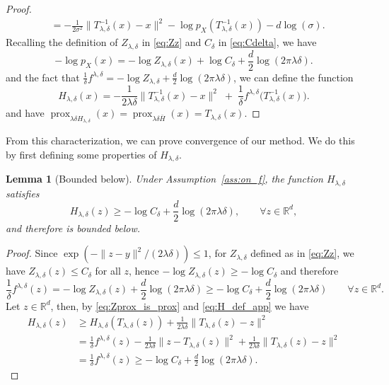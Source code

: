 \documentclass{article}
\newtheorem{lemma}{Lemma}
\newcommand{\R}{\mathbb{R}}
\newcommand{\prox}{\ensuremath{\operatorname{prox}}}
\begin{document}
\begin{proof}
\[\begin{aligned}
    & = - \frac{1}{2\sigma^2} \| T_{\lambda,\delta} ^{-1} (x) - x\|^2-\log p_{ X} ( T_{\lambda,\delta}^{-1}(x)) - d\log(\sigma).
    \end{aligned}\]
Recalling the definition of $Z_{\lambda,\delta}$ in \eqref{eq:Zz} and $C_\delta$ in \eqref{eq:Cdelta}, we have
\begin{equation}
- \log p_X(x) =-\log Z_{\lambda,\delta}(x) + \log C_\delta+\frac{d}{2}\log(2\pi\lambda\delta).
\label{eq:h_def_noD}
\end{equation}
and the fact that $\frac{1}{\delta}f^{\lambda,\delta}=- \log Z_{\lambda,\delta} +\frac{d}{2}\log(2\pi\lambda\delta)$, we  can define the function
\begin{equation}
H_{\lambda,\delta}(x) =
    -\frac{1}{2\lambda\delta}\big\| T_{\lambda,\delta}^{-1}(x)-x\big\|^2\;+\;\frac{1}{\delta}f^{\lambda,\delta}\!\big( T_{\lambda,\delta}^{-1}(x)\big).
\label{eq:H_def_app}
\end{equation} 
and have $\prox_{\lambda \delta H_{\lambda,\delta}} (x) = \prox_{\lambda \delta \bar H} (x) = T_{\lambda,\delta}(x)$.
\end{proof}

From this characterization, we can prove convergence of our method. We do this by first defining some properties of $H_{\lambda,\delta}$.


\begin{lemma}[Bounded below]
Under Assumption~\ref{ass:on_f}, the function $H_{\lambda,\delta}$ satisfies
\[H_{\lambda,\delta}(z)\geq - \log C_\delta +\frac{d}{2} \log(2\pi \lambda \delta), \qquad \forall z \in \R^d,\]
and therefore is bounded below.
\end{lemma}
\begin{proof}
Since $\exp(-\|z-y\|^2/(2\lambda\delta))\le 1$, for $Z_{\lambda,\delta}$ defined as in \eqref{eq:Zz}, we have $Z_{\lambda,\delta}(z)\le C_\delta$ for all $z$, hence
$-\log Z_{\lambda,\delta}(z)\ge -\log C_\delta$ and therefore
\[
\frac{1}{\delta}f^{\lambda,\delta}(z) = -\log Z_{\lambda,\delta}(z) + \frac{d}{2}\log(2\pi \lambda \delta) \ge - \log C_\delta + \frac{d}{2}\log(2\pi\lambda\delta)\qquad\forall z\in\mathbb{R}^d.
\]
Let $z \in \R^d$, then, by \eqref{eq:Zprox_is_prox} and \eqref{eq:H_def_app} we have
\[\begin{aligned}
    H_{\lambda,\delta}(z) &\geq H_{\lambda,\delta}(T_{\lambda,\delta}(z)) + \frac{1}{2\lambda \delta}\|T_{\lambda,\delta}(z) - z\|^2 \\
    &= \frac{1}{\delta} f^{\lambda, \delta}(z) -\frac{1}{2\lambda \delta}\|z - T_{\lambda,\delta}(z)\|^2 + \frac{1}{2\lambda \delta}\|T_{\lambda,\delta}(z) - z\|^2 \\
    & = \frac{1}{\delta}f^{\lambda, \delta}(z)\geq - \log C_\delta + \frac{d}{2} \log(2\pi \lambda \delta).  
    \end{aligned}\]
\end{proof}
\end{document}
